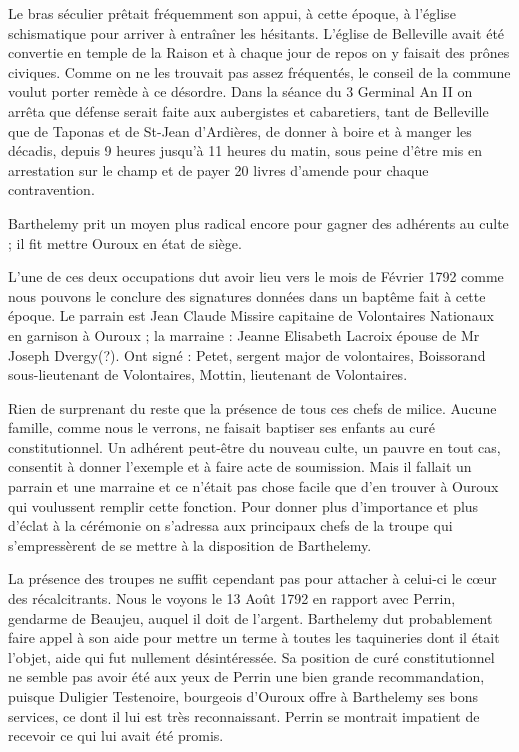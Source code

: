 Le bras séculier prêtait fréquemment son appui, à cette époque, à l'église schismatique pour arriver à entraîner les hésitants. L'église de Belleville avait été convertie en temple de la Raison et à chaque jour de repos on y faisait des prônes civiques. Comme on ne les trouvait pas assez fréquentés, le conseil de la commune voulut porter remède à ce désordre. Dans la séance du 3 Germinal An II on
arrêta que défense serait faite aux aubergistes et cabaretiers, tant
de Belleville que de Taponas et de St-Jean d'Ardières, de donner à
boire et à manger les décadis, depuis 9 heures jusqu'à 11 heures du
matin, sous peine d'être mis en arrestation sur le champ et de payer
20 livres d'amende pour chaque contravention.

Barthelemy prit un moyen plus radical encore pour gagner des adhérents au culte ; il fit mettre Ouroux en état de siège.

L'une de ces deux occupations dut avoir lieu vers le mois de Février 1792 comme nous pouvons le conclure des signatures données
dans un baptême fait à cette époque. Le parrain est Jean Claude Missire capitaine de Volontaires Nationaux en garnison à Ouroux ; la marraine : Jeanne Elisabeth Lacroix épouse de Mr Joseph Dvergy(?). Ont
signé : Petet, sergent major de volontaires, Boissorand sous-lieutenant
de Volontaires, Mottin, lieutenant de Volontaires.

Rien de surprenant du reste que la présence de tous ces chefs de
milice. Aucune famille, comme nous le verrons, ne faisait baptiser ses
enfants au curé constitutionnel. Un adhérent peut-être du nouveau
culte, un pauvre en tout cas, consentit à donner l'exemple et à faire
acte de soumission. Mais il fallait un parrain et une marraine et
ce n'était pas chose facile que d'en trouver à Ouroux qui voulussent
remplir cette fonction. Pour donner plus d'importance et plus d'éclat à la cérémonie on s'adressa aux principaux chefs de la troupe
qui s'empressèrent de se mettre à la disposition de Barthelemy.

La présence des troupes ne suffit cependant pas pour attacher à
celui-ci le cœur des récalcitrants. Nous le voyons le 13 Août 1792
en rapport avec Perrin, gendarme de Beaujeu, auquel il doit de l'argent. Barthelemy dut probablement faire appel à son aide pour mettre
un terme à toutes les taquineries dont il était l'objet, aide qui
fut nullement désintéressée. Sa position de curé constitutionnel ne
semble pas avoir été aux yeux de Perrin une bien grande recommandation, puisque Duligier Testenoire, bourgeois d'Ouroux offre à Barthelemy ses bons services, ce dont il lui est très reconnaissant. Perrin se montrait impatient de recevoir ce qui lui avait été promis.

